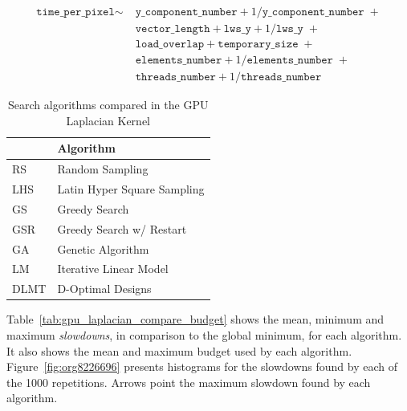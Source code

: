 \documentclass[conference]{IEEEtran}
\begin{document}
{\scriptsize
\begin{align}
\label{eq:gpu_laplacian_performance_model}
\texttt{time\_per\_pixel} \sim & \; \texttt{y\_component\_number} + 1 / \texttt{y\_component\_number} \; + \nonumber \\
& \; \texttt{vector\_length} + \texttt{lws\_y} + 1 / \texttt{lws\_y} \; + \nonumber \\
& \; \texttt{load\_overlap} + \texttt{temporary\_size} \; + \\
& \; \texttt{elements\_number} + 1 / \texttt{elements\_number} \; + \nonumber \\
& \; \texttt{threads\_number} + 1 /\texttt{threads\_number} \nonumber
\end{align}
}

\begin{table}[ht]
\caption{\label{tab:orgb51795f}
Search algorithms compared in the GPU Laplacian Kernel}
\centering
\footnotesize
\begin{tabular}{ll}
\toprule
 & Algorithm\\
\midrule
RS & Random Sampling\\
LHS & Latin Hyper Square Sampling\\
GS & Greedy Search\\
GSR & Greedy Search w/ Restart\\
GA & Genetic Algorithm\\
LM & Iterative Linear Model\\
DLMT & D-Optimal Designs\\
\bottomrule
\end{tabular}
\end{table}

Table~\ref{tab:gpu_laplacian_compare_budget} shows the mean, minimum and
maximum \emph{slowdowns}, in comparison to the global minimum, for each algorithm. It
also shows the mean and maximum budget used by each algorithm.
Figure~\ref{fig:org8226696} presents histograms for the
slowdowns found by each of the 1000 repetitions. Arrows point the maximum
slowdown found by each algorithm.
\end{document}
